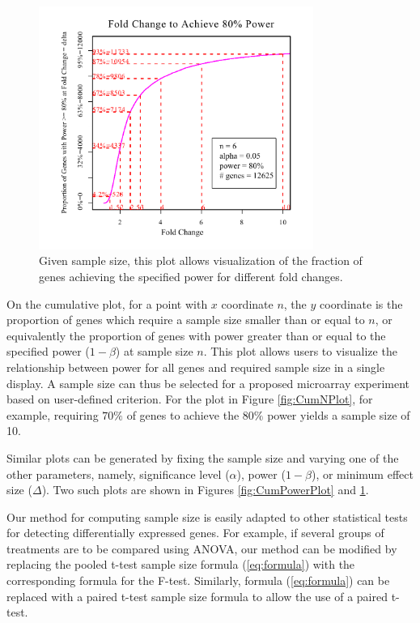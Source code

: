 \documentclass[12pt]{article}
\begin{document}
\begin{figure}%
  \caption[Given Sample Size, Fold Change (Effect Size) Necessary to
    Achieving a Specified Power]{Given sample size, this plot allows
    visualization of the fraction of genes achieving the specified
    power for different fold changes.}
  \label{fig:CumFoldChangePlot}
  \centerline{\includegraphics*[width=0.8\textwidth]{CumFoldChangePlotP.pdf}}
\end{figure}

On the cumulative plot, for a point with $x$ coordinate $n$, the
$y$ coordinate is the proportion of genes which require a sample
size smaller than or equal to $n$, or equivalently the proportion
of genes with power greater than or equal to the specified power
($1-\beta$) at sample size $n$. This plot allows users to
visualize the relationship between power for all genes and
required sample size in a single display.  A sample size can thus
be selected for a proposed microarray experiment based on
user-defined criterion. For the plot in Figure \ref{fig:CumNPlot},
for example, requiring $70\%$ of genes to achieve the $80\%$ power
yields a sample size of 10.

Similar plots can be generated by fixing the sample size and
varying one of the other parameters, namely, significance level
($\alpha$), power ($1-\beta$), or minimum effect size ($\Delta$). Two
such plots are shown in Figures \ref{fig:CumPowerPlot} and
\ref{fig:CumFoldChangePlot}.

Our method for computing sample size is easily adapted to other
statistical tests for detecting differentially expressed genes. For
example, if several groups of treatments are to be compared using
ANOVA, our method can be modified by replacing the pooled t-test
sample size formula (\ref{eq:formula}) with the corresponding
formula for the F-test. Similarly, formula (\ref{eq:formula}) can be
replaced with a paired t-test sample size formula to allow the use
of a paired t-test.
\end{document}

